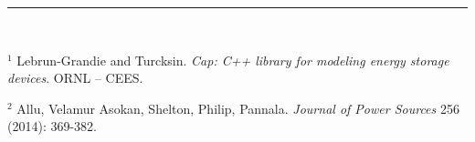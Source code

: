 \documentclass[8pt]{beamer}
\begin{document}
\begin{frame}
\vspace{0.1in}
\noindent\rule{5cm}{0.4pt}\\
\begin{footnotesize}
$^1$ Lebrun-Grandie and Turcksin. \textit{Cap: C++ library for modeling energy storage devices}. ORNL -- CEES.

$^2$ Allu, Velamur Asokan, Shelton, Philip, Pannala. \textit{Journal of Power Sources} 256 (2014): 369-382.
\end{footnotesize}

\vfill
\end{frame}
\end{document}
